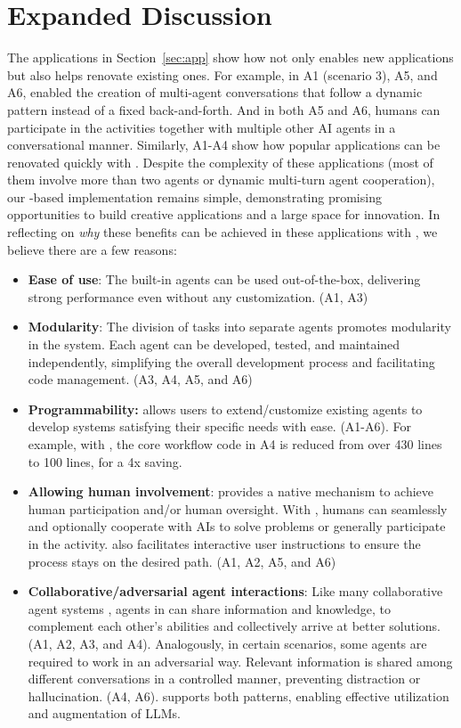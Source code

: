 \clearpage
\section{Expanded Discussion}
\label{append:summary}

The applications in Section~\ref{sec:app} show how \libName not only enables new applications but also helps renovate existing ones.
For example, in A1 (scenario 3), A5, and A6, \libName enabled the creation of multi-agent conversations that follow a dynamic pattern instead of a fixed back-and-forth. And in both A5 and A6, humans can participate in the activities together with multiple other AI agents in a conversational manner.
Similarly, A1-A4 show how popular applications can be renovated quickly with \libName.
Despite the complexity of these applications (most of them involve more than two agents or dynamic multi-turn agent cooperation), our \libName-based implementation remains simple, demonstrating promising opportunities to build creative applications and a large space for innovation. In reflecting on {\em why} these benefits can be achieved in these applications with \libName, we believe there are a few reasons:
\begin{itemize}[leftmargin=*]
    \vspace{-1mm}
    \setlength\itemsep{-0.1em}
    \item \textbf{Ease of use}: The built-in agents can be used out-of-the-box, delivering strong performance even without any customization. (A1, A3)
    \item \textbf{Modularity}: The division of tasks into separate agents promotes modularity in the system. Each agent can be developed, tested, and maintained independently, simplifying the overall development process and facilitating code management. (A3, A4, A5, and A6)
    \item \textbf{Programmability:} \libName allows users to extend/customize existing agents to develop systems satisfying their specific needs with ease. (A1-A6). For example, with \libName, the core workflow code in A4 is reduced from over 430 lines to 100 lines, for a 4x saving. 
    \item \textbf{Allowing human involvement}: \libName provides a native mechanism to achieve human participation and/or human oversight. With \libName, humans can seamlessly and optionally cooperate with AIs to solve problems or generally participate in the activity. \libName also facilitates interactive user instructions to ensure the process stays on the desired path. (A1, A2, A5, and A6)
    \item \textbf{Collaborative/adversarial agent interactions}: Like many collaborative agent systems \cite{dong2023self}, agents in \libName can share information and knowledge, to complement each other's abilities and collectively arrive at better solutions. (A1, A2, A3, and A4). Analogously, in certain scenarios, some agents are required to work in an adversarial way. Relevant information is shared among different conversations in a controlled manner, preventing distraction or hallucination. (A4, A6). \libName supports both patterns, enabling effective utilization and augmentation of LLMs.
\end{itemize}

